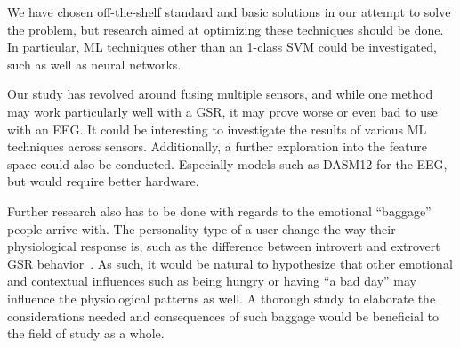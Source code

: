 We have chosen off-the-shelf standard and basic solutions in our attempt to solve the problem, but research aimed at optimizing these techniques should be done. 
In particular, ML techniques other than an 1-class SVM could be investigated, such as well as neural networks.

Our study has revolved around fusing multiple sensors, and while one method may work particularly well with a GSR, it may prove worse or even bad to use with an EEG. 
It could be interesting to investigate the results of various ML techniques across sensors.
Additionally, a further exploration into the feature space could also be conducted. 
Especially models such as DASM12\cite{eeg_music_listening} for the EEG, but would require better hardware.

Further research also has to be done with regards to the emotional ``baggage'' people arrive with. 
The personality type of a user change the way their physiological response is, such as the difference between introvert and extrovert GSR behavior~\cite{Foglia20081814}.
As such, it would be natural to hypothesize that other emotional and contextual influences such as being hungry or having ``a bad day'' may influence the physiological patterns as well. 
A thorough study to elaborate the considerations needed and consequences of such baggage would be beneficial to the field of study as a whole. 
